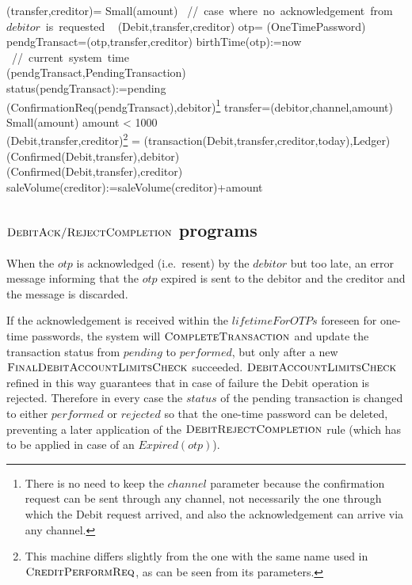 \begin{asm}
(transfer,creditor)=\+
\IF Small(amount) 
\mbox{  // case where no acknowledgement from $debitor$ is requested}\+
   \THEN ~ (Debit,transfer,creditor) \-
   \ELSE \+
       \LET otp= \NEW(OneTimePassword)\\
       \LET pendgTransact=(otp,transfer,creditor)\+
          birthTime(otp):=now \mbox{ // current system time}\\
          (pendgTransact,PendingTransaction)\\ 
          status(pendgTransact):=pending \\
          (ConfirmationReq(pendgTransact),\TO debitor)\footnote{There is no need to keep the $channel$ parameter because the confirmation request can be sent through any channel, not necessarily the one through which the Debit request arrived, and also the acknowledgement can arrive via any channel.}
       \dec\-
\WHERE \+
transfer=(debitor,channel,amount)\\
Small(amount) \IFF amount < 1000 \\
 (Debit,transfer,creditor)\footnote{This machine differs slightly from the one with the same name used in $\hbox{\sc CreditPerformReq}$, as can be seen from its parameters.} =\+     
   (transaction(Debit,transfer,creditor,today),Ledger)\\
   (Confirmed(Debit,transfer),\TO debitor)\\
   (Confirmed(Debit,transfer),\TO creditor)\\
   saleVolume(creditor):=saleVolume(creditor)+amount
\end{asm}


\subsection{ $\hbox{\sc DebitAck/RejectCompletion}$ programs}
\label{sect:debitackreject}

When the $otp$ is acknowledged (i.e.\ resent) by the $debitor$ but too late, an error message informing that the $otp$ expired is sent to the debitor and the creditor and the message is discarded.

If the acknowledgement is received within the $lifetimeForOTPs$ foreseen for one-time passwords, the system will $\hbox{\sc CompleteTransaction}$ and update the transaction status from $pending$ to $performed$, but only after a new $\hbox{\sc FinalDebitAccountLimitsCheck}$ succeeded. $\hbox{\sc DebitAccountLimitsCheck}$  refined in this way guarantees that in case of failure the Debit operation is rejected. Therefore in every case the $status$ of the pending transaction is changed to either $performed$ or $rejected$ so that the one-time password can be deleted,  preventing a later application of the $\hbox{\sc DebitRejectCompletion}$ rule (which has to be applied in case of an $Expired(otp)$).


